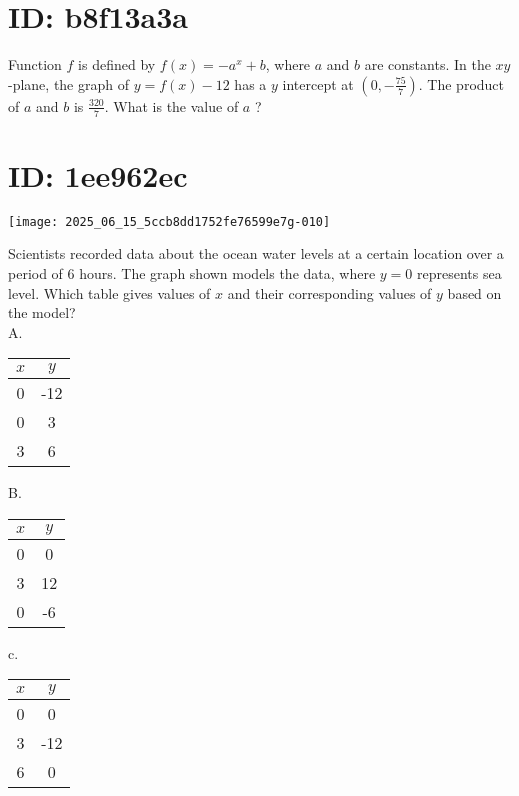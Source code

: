 \section*{ID: b8f13a3a}
Function $f$ is defined by $f(x)=-a^{x}+b$, where $a$ and $b$ are constants. In the $x y$-plane, the graph of $y=f(x)-12$ has a $y$ intercept at $\left(0,-\frac{75}{7}\right)$. The product of $a$ and $b$ is $\frac{320}{7}$. What is the value of $a$ ?

\section*{ID: 1ee962ec}
\begin{center}
\texttt{[image: 2025\_06\_15\_5ccb8dd1752fe76599e7g-010]}
\end{center}

Scientists recorded data about the ocean water levels at a certain location over a period of 6 hours. The graph shown models the data, where $y=0$ represents sea level. Which table gives values of $x$ and their corresponding values of $y$ based on the model?\\
A.

\begin{center}
\begin{tabular}{|c|c|}
\hline
$x$ & $y$ \\
\hline
0 & -12 \\
\hline
0 & 3 \\
\hline
3 & 6 \\
\hline
\end{tabular}
\end{center}

B.

\begin{center}
\begin{tabular}{|c|c|}
\hline
$x$ & $y$ \\
\hline
0 & 0 \\
\hline
3 & 12 \\
\hline
0 & -6 \\
\hline
\end{tabular}
\end{center}

c.

\begin{center}
\begin{tabular}{|c|c|}
\hline
$x$ & $y$ \\
\hline
0 & 0 \\
\hline
3 & -12 \\
\hline
6 & 0 \\
\hline
\end{tabular}
\end{center}

